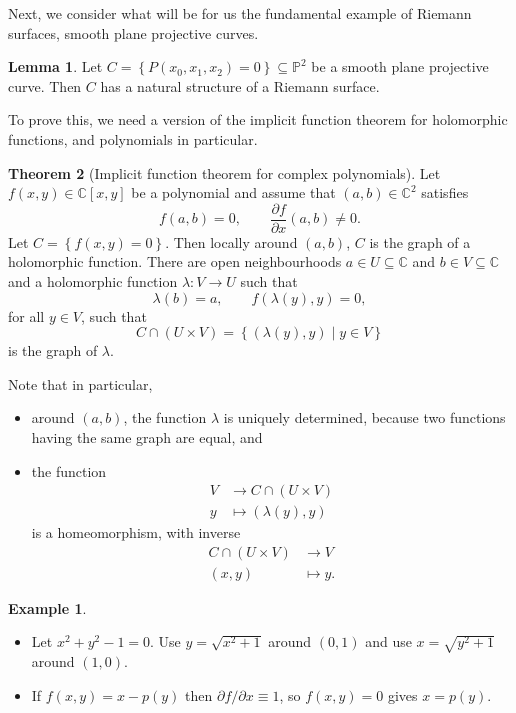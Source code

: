 \documentclass{article}
\newcommand{\C}{\mathbb{C}}
\renewcommand{\P}{\mathbb{P}}
\newcommand{\rb}[1]{\left( #1 \right)}
\renewcommand{\sb}[1]{\left[ #1 \right]}
\newcommand{\cb}[1]{\left\{ #1 \right\}}
\theoremstyle{definition}\newtheorem{definition}{Definition}[section]
\theoremstyle{definition}\newtheorem{notation}[definition]{Notation}
\theoremstyle{definition}\newtheorem{remark}[definition]{Remark}
\theoremstyle{definition}\newtheorem{example1}[definition]{Example}
\theoremstyle{definition}\newtheorem{fact}{Fact}
\theoremstyle{definition}\newtheorem{exercise}{Exercise}
\theoremstyle{definition}\newtheorem*{example2}{Example}
\newtheorem{lemma}[definition]{Lemma}
\newtheorem{theorem}[definition]{Theorem}
\begin{document}
Next, we consider what will be for us the fundamental example of Riemann surfaces, smooth plane projective curves.

\begin{lemma}
\label{lem:15.5}
Let $ C = \cb{P\rb{x_0, x_1, x_2} = 0} \subseteq \P^2 $ be a smooth plane projective curve. Then $ C $ has a natural structure of a Riemann surface.
\end{lemma}

To prove this, we need a version of the implicit function theorem for holomorphic functions, and polynomials in particular.

\begin{theorem}[Implicit function theorem for complex polynomials]
Let $ f\rb{x, y} \in \C\sb{x, y} $ be a polynomial and assume that $ \rb{a, b} \in \C^2 $ satisfies
$$ f\rb{a, b} = 0, \qquad \dfrac{\partial f}{\partial x}\rb{a, b} \ne 0. $$
Let $ C = \cb{f\rb{x, y} = 0} $. Then locally around $ \rb{a, b} $, $ C $ is the graph of a holomorphic function. There are open neighbourhoods $ a \in U \subseteq \C $ and $ b \in V \subseteq \C $ and a holomorphic function $ \lambda : V \to U $ such that
$$ \lambda\rb{b} = a, \qquad f\rb{\lambda\rb{y}, y} = 0, $$
for all $ y \in V $, such that
$$ C \cap \rb{U \times V} = \cb{\rb{\lambda\rb{y}, y} \mid y \in V} $$
is the graph of $ \lambda $.
\end{theorem}

Note that in particular,
\begin{itemize}
\item around $ \rb{a, b} $, the function $ \lambda $ is uniquely determined, because two functions having the same graph are equal, and
\item the function
\begin{align*}
V & \to C \cap \rb{U \times V} \\
y & \mapsto \rb{\lambda\rb{y}, y}
\end{align*}
is a homeomorphism, with inverse
\begin{align*}
C \cap \rb{U \times V} & \to V \\
\rb{x, y} & \mapsto y.
\end{align*}
\end{itemize}

\begin{example2}
\hfill
\begin{itemize}
\item Let $ x^2 + y^2 - 1 = 0 $. Use $ y = \sqrt{x^2 + 1} $ around $ \rb{0, 1} $ and use $ x = \sqrt{y^2 + 1} $ around $ \rb{1, 0} $.
\item If $ f\rb{x, y} = x - p\rb{y} $ then $ \partial f / \partial x \equiv 1 $, so $ f\rb{x, y} = 0 $ gives $ x = p\rb{y} $.
\end{itemize}
\end{example2}
\end{document}
